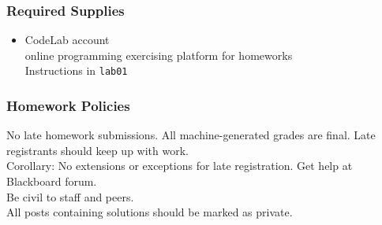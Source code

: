 \documentclass[11pt]{beamer}
\begin{document}
\begin{frame}
  \frametitle{Required Supplies}

  \begin{itemize}
    \item CodeLab account \\ \textcolor{\CSGradBot}{\footnotesize\hspace{1em} online programming exercising platform for homeworks} \pause
    					\\ \textcolor{\CSGradBot}{\footnotesize\hspace{1em} Instructions in \texttt{lab01}} 
  \end{itemize}
\end{frame}


\begin{frame}
  \frametitle{Homework Policies}
  \Enlarge

  \begin{itemize}
    \myitem No late homework submissions. \pause
    \myitem All machine-generated grades are final. \pause
    \myitem Late registrants should keep up with work. \\ \textcolor{\CSGradBot}{\footnotesize\hspace{1em} Corollary:  No extensions or exceptions for late registration.} \pause
    \myitem Get help at Blackboard forum. \\ \textcolor{\CSGradBot}{\footnotesize\hspace{1em} Be civil to staff and peers.}\pause 
    							       \\ \textcolor{\CSGradBot}{\footnotesize\hspace{1em} All posts containing solutions should be marked as private.}
  \end{itemize}
\end{frame}
\end{document}
